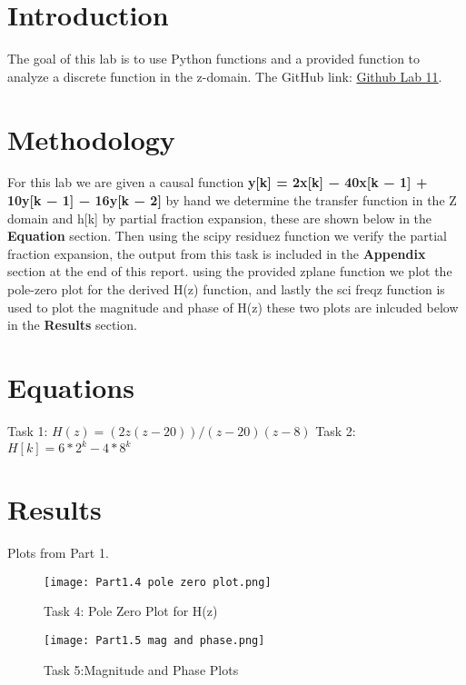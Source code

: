 \documentclass[12pt]{report}
\begin{document}
\section{Introduction}
The goal of this lab is to use Python functions and a provided function to analyze a discrete function in the z-domain.
\newline \newline The GitHub link: \href{https://github.com/CDJohnson279}{Github Lab 11}. 

\section{Methodology}
For this lab we are given a causal function \textbf{ y[k] = 2x[k] − 40x[k − 1] + 10y[k − 1] − 16y[k − 2]} by hand we determine the transfer function in the Z domain and h[k] by partial fraction expansion, these are shown below in the \textbf{Equation} section. Then using the scipy residuez function we verify the partial fraction expansion, the output from this task is included in the \textbf{Appendix} section at the end of this report. using the provided zplane function we plot the pole-zero plot for the derived H(z) function, and lastly the sci
freqz function is used to plot the magnitude and phase of H(z) these two plots are inlcuded below in the \textbf{Results} section.
\section{Equations}
Task 1:
$H(z) = (2z(z-20))/(z-20)(z-8)$ \newline
Task 2:
$H[k] = 6*2^k -4*8^k$
\newpage
\section{Results}
Plots from Part 1.\newline 

\begin{figure}[h!]
    \centering
    \texttt{[image: Part1.4 pole zero plot.png]}
    \caption{Task 4: Pole Zero Plot for H(z) }
    \label{Task 4}
\end{figure}

\begin{figure}[h!]
    \centering
    \texttt{[image: Part1.5 mag and phase.png]}
    \caption{Task 5:Magnitude and Phase Plots }
    \label{Task 5}
    \newpage 
\end{figure}
\newpage 
\end{document}
